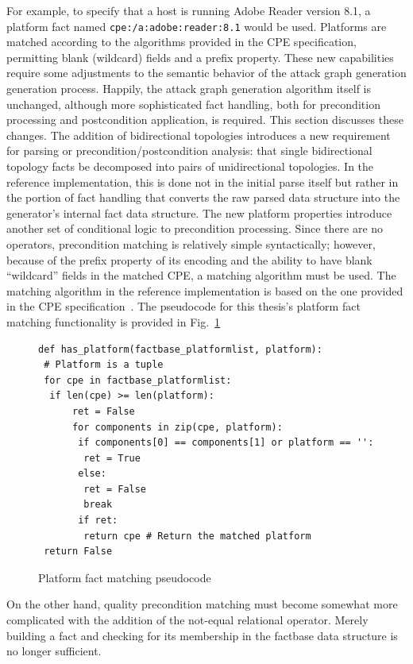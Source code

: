 For example, to specify that a host is running Adobe Reader version 8.1, a 
platform fact named \texttt{cpe:/a:adobe:reader:8.1} would be used. Platforms
are matched according to the algorithms provided in the CPE specification,
permitting blank (wildcard) fields and a prefix property.
These new capabilities require some adjustments to the semantic behavior of the
attack graph generation generation process. Happily, the attack graph generation
algorithm itself is unchanged, although more sophisticated fact handling,
both for precondition processing and postcondition application,
is required. This section discusses these changes.
The addition of bidirectional topologies introduces a new requirement for
parsing or precondition/postcondition analysis: that single bidirectional 
topology facts be decomposed into pairs
of unidirectional topologies. In the reference implementation, this is done
not in the initial parse itself but rather in the portion of fact handling that
converts the raw parsed data structure into the generator's internal fact
data structure.
The new platform properties introduce another set of conditional logic to
precondition processing. Since there are no operators, precondition matching
is relatively simple syntactically; however, because of the prefix
property of its encoding and the ability to have blank ``wildcard'' fields
in the matched CPE, a matching algorithm must be used. The matching algorithm
in the reference implementation is based on the one provided in the CPE
specification~\cite{buttner2009common}.
The pseudocode for this thesis's platform fact matching functionality is
provided in Fig.~\ref{fig:cpe_match_pc}

\begin{figure}
\begin{lstlisting}
def has_platform(factbase_platformlist, platform):
 # Platform is a tuple
 for cpe in factbase_platformlist:
  if len(cpe) >= len(platform):
      ret = False
      for components in zip(cpe, platform):
       if components[0] == components[1] or platform == '':
        ret = True
       else:
        ret = False
        break
       if ret:
        return cpe # Return the matched platform
 return False
\end{lstlisting}
\caption{Platform fact matching pseudocode}
\label{fig:cpe_match_pc}
\end{figure}
On the other hand, quality precondition matching must become
somewhat more complicated with the addition of the not-equal relational
operator. Merely building a fact and checking for its membership in the
factbase data structure is no longer sufficient. 

